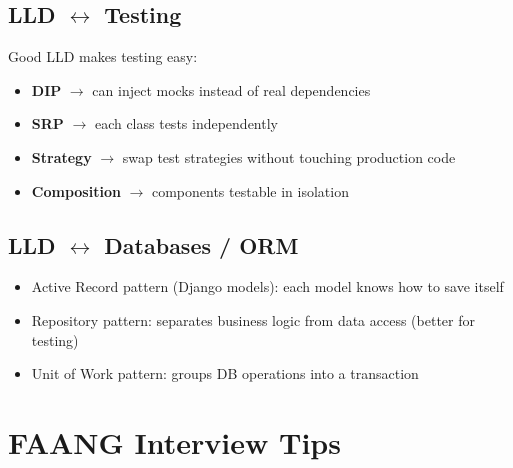 \documentclass[11pt]{article}
\providecommand{\tightlist}{\setlength{\itemsep}{1pt}\setlength{\parskip}{0pt}}
\begin{document}
\subsection{\texorpdfstring{LLD \(\leftrightarrow\) Testing}{LLD \textbackslash leftrightarrow Testing}}\label{lld-leftrightarrow-testing}

Good LLD makes testing easy:

\begin{itemize}
\tightlist
\item
  \textbf{DIP} \(\rightarrow\) can inject mocks instead of real dependencies
\item
  \textbf{SRP} \(\rightarrow\) each class tests independently
\item
  \textbf{Strategy} \(\rightarrow\) swap test strategies without touching production code
\item
  \textbf{Composition} \(\rightarrow\) components testable in isolation
\end{itemize}

\subsection{\texorpdfstring{LLD \(\leftrightarrow\) Databases / ORM}{LLD \textbackslash leftrightarrow Databases / ORM}}\label{lld-leftrightarrow-databases--orm}

\begin{itemize}
\tightlist
\item
  Active Record pattern (Django models): each model knows how to save itself
\item
  Repository pattern: separates business logic from data access (better for testing)
\item
  Unit of Work pattern: groups DB operations into a transaction
\end{itemize}

\section{FAANG Interview Tips}\label{faang-interview-tips}
\end{document}
